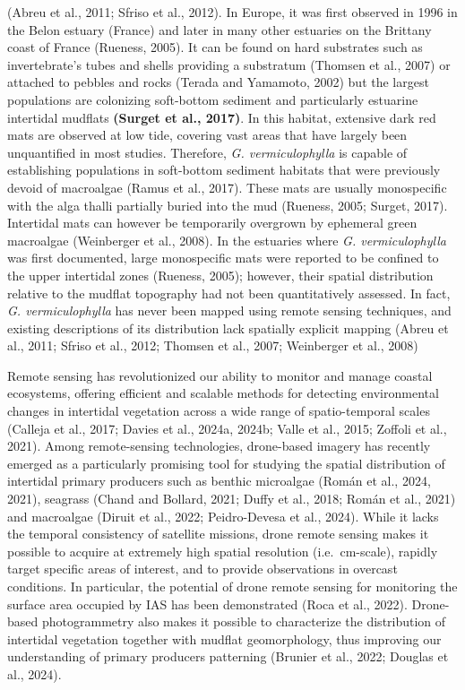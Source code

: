 \documentclass[
  letterpaper,
  DIV=11,
  numbers=noendperiod]{scrartcl}
\begin{document}
(Abreu et al., 2011; Sfriso et al., 2012). In Europe, it was first
observed in 1996 in the Belon estuary (France) and later in many other
estuaries on the Brittany coast of France (Rueness, 2005). It can be
found on hard substrates such as invertebrate's tubes and shells
providing a substratum (Thomsen et al., 2007) or attached to pebbles and
rocks (Terada and Yamamoto, 2002) but the largest populations are
colonizing soft-bottom sediment and particularly estuarine intertidal
mudflats \textbf{(Surget et al., 2017)}. In this habitat, extensive dark
red mats are observed at low tide, covering vast areas that have largely
been unquantified in most studies. Therefore, \emph{G. vermiculophylla}
is capable of establishing populations in soft-bottom sediment habitats
that were previously devoid of macroalgae (Ramus et al., 2017). These
mats are usually monospecific with the alga thalli partially buried into
the mud (Rueness, 2005; Surget, 2017). Intertidal mats can however be
temporarily overgrown by ephemeral green macroalgae (Weinberger et al.,
2008). In the estuaries where \emph{G. vermiculophylla} was first
documented, large monospecific mats were reported to be confined to the
upper intertidal zones (Rueness, 2005); however, their spatial
distribution relative to the mudflat topography had not been
quantitatively assessed. In fact, \emph{G. vermiculophylla} has never
been mapped using remote sensing techniques, and existing descriptions
of its distribution lack spatially explicit mapping (Abreu et al., 2011;
Sfriso et al., 2012; Thomsen et al., 2007; Weinberger et al., 2008)

Remote sensing has revolutionized our ability to monitor and manage
coastal ecosystems, offering efficient and scalable methods for
detecting environmental changes in intertidal vegetation across a wide
range of spatio-temporal scales (Calleja et al., 2017; Davies et al.,
2024a, 2024b; Valle et al., 2015; Zoffoli et al., 2021). Among
remote-sensing technologies, drone-based imagery has recently emerged as
a particularly promising tool for studying the spatial distribution of
intertidal primary producers such as benthic microalgae (Román et al.,
2024, 2021), seagrass (Chand and Bollard, 2021; Duffy et al., 2018;
Román et al., 2021) and macroalgae (Diruit et al., 2022; Peidro-Devesa
et al., 2024). While it lacks the temporal consistency of satellite
missions, drone remote sensing makes it possible to acquire at extremely
high spatial resolution (i.e.~cm-scale), rapidly target specific areas
of interest, and to provide observations in overcast conditions. In
particular, the potential of drone remote sensing for monitoring the
surface area occupied by IAS has been demonstrated (Roca et al., 2022).
Drone-based photogrammetry also makes it possible to characterize the
distribution of intertidal vegetation together with mudflat
geomorphology, thus improving our understanding of primary producers
patterning (Brunier et al., 2022; Douglas et al., 2024).
\end{document}
